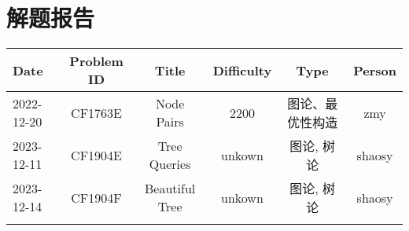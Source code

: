 \chapter{解题报告}
\begin{center}
\begin{longtable}{l c c c c c }

Date & Problem ID & Title & Difficulty & Type & Person   \\ 
\hline
2022-12-20 & CF1763E & Node Pairs & 2200 & 图论、最优性构造 & zmy  \\
\hline
2023-12-11 & CF1904E & Tree Queries & unkown & 图论, 树论 & shaosy \\
\hline
2023-12-14 & CF1904F & Beautiful Tree & unkown & 图论, 树论 & shaosy \\

\hline

\label{tab:practice_index}
\end{longtable}
\end{center}

